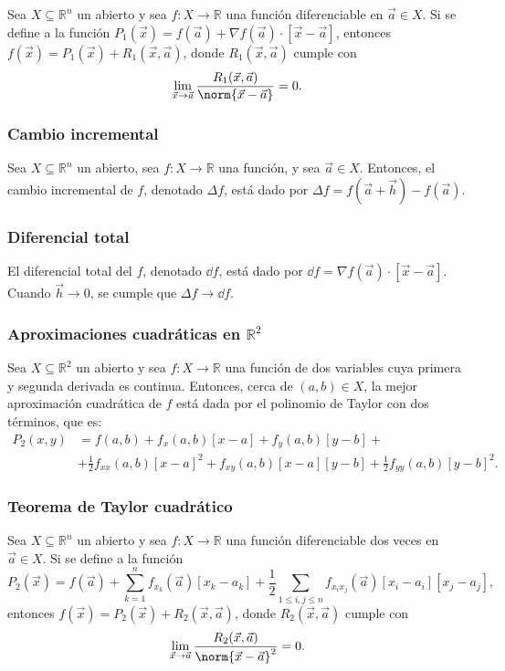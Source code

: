 \documentclass{article}
\begin{document}
Sea $X\subseteq\mathbb{R}^n$ un abierto y sea $f:X\to\mathbb{R}$ una función diferenciable en $\vec{a}\in X$. Si se define a la función $P_1(\vec{x})=f(\vec{a})+\nabla f(\vec{a})\cdot[\vec{x}-\vec{a}]$, entonces $f(\vec{x})=P_1(\vec{x})+R_1(\vec{x},\vec{a})$, donde $R_1(\vec{x},\vec{a})$ cumple con
$$\lim_{\vec{x}\to\vec{a}}\frac{R_1(\vec{x},\vec{a})}{\norm{\vec{x}-\vec{a}}}=0.$$

\subsubsection*{Cambio incremental}

Sea $X\subseteq\mathbb{R}^n$ un abierto, sea $f:X\to\mathbb{R}$ una función, y sea $\vec{a}\in X$. Entonces, el cambio incremental de $f$, denotado $\Delta f$, está dado por $\Delta f=f(\vec{a}+\vec{h})-f(\vec{a})$.

\subsubsection*{Diferencial total}

El diferencial total del $f$, denotado $\dd{f}$, está dado por $\dd{f}=\nabla f(\vec{a})\cdot[\vec{x}-\vec{a}]$. Cuando $\vec{h}\to 0$, se cumple que $\Delta f\to \dd{f}$. 

\subsubsection*{Aproximaciones cuadráticas en $\mathbb{R}^2$}

Sea $X\subseteq\mathbb{R}^2$ un abierto y sea $f:X\to\mathbb{R}$ una función de dos variables cuya primera y segunda derivada es continua. Entonces, cerca de $(a,b)\in X$, la mejor aproximación cuadrática de $f$ está dada por el polinomio de Taylor con dos términos, que es:
\begin{align*}
P_2(x,y)&=f(a,b)+f_x(a,b)[x-a]+f_y(a,b)[y-b]+\\
&+\frac{1}{2}f_{xx}(a,b)[x-a]^2+f_{xy}(a,b)[x-a][y-b]+\frac{1}{2}f_{yy}(a,b)[y-b]^2.
\end{align*}

\subsubsection*{Teorema de Taylor cuadrático}

Sea $X\subseteq\mathbb{R}^n$ un abierto y sea $f:X\to\mathbb{R}$ una función diferenciable dos veces en $\vec{a}\in X$. Si se define a la función 
$$P_2(\vec{x})=f(\vec{a})+\sum_{k=1}^n f_{x_k}(\vec{a})[x_k-a_k]+\frac{1}{2}\sum_{1\leq i,j\leq n} f_{x_ix_j}(\vec{a})[x_i-a_i][x_j-a_j],$$
entonces $f(\vec{x})=P_2(\vec{x})+R_2(\vec{x},\vec{a})$, donde $R_2(\vec{x},\vec{a})$ cumple con
$$\lim_{\vec{x}\to\vec{a}}\frac{R_2(\vec{x},\vec{a})}{\norm{\vec{x}-\vec{a}}^2}=0.$$
\end{document}
